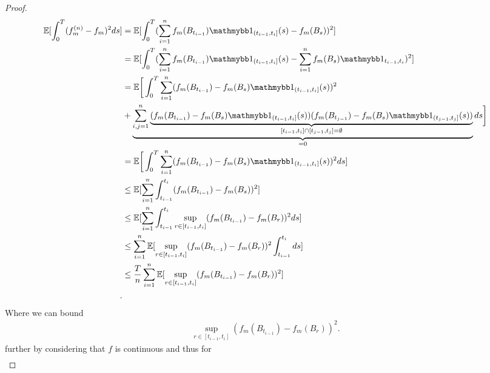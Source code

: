 \begin{proof}
\begin{align*}
  \E[\int_0^{T}  (f_m^{(n)} - f_m )^2 ds] &= \E[\int_0^{T} (\sum_{i=1}^{n} f_m(B_{t_{i-1}})\cha_{(t_{i-1},t_i]}(s) - f_m(B_s))^2 ] \\
                                          &= \E[\int_0^{T} (\sum_{i=1}^{n} f_m(B_{t_{i-1}})\cha_{(t_{i-1},t_i]}(s) - \sum_{i=1}^{n} f_m(B_s) \cha_{t_{{i-1}},t_i})^2 ] \\
                                          &= \E\bigg[\int_0^{T} \sum_{i=1}^{n} (f_m(B_{t_{i-1}})-f_{m}(B_s)\cha_{(t_{i-1},t_i]}(s))^2 \\
                                          &+ \underbrace{\sum_{i,j=1}^{n} \underbrace{(f_m(B_{t_{i-1}})-f_{m}(B_s)\cha_{(t_{i-1},t_i]}(s))(f_m(B_{t_{j-1}})-f_{m}(B_s)\cha_{(t_{j-1},t_j]}(s))}_{{[t_{i-1}},t_i] \cap [t_{j-1},t_{j}] = \emptyset }}_{=0}  ds \bigg] \\
                                          &= \E\bigg[\int_0^{T} \sum_{i=1}^{n} (f_m(B_{t_{i-1}})-f_{m}(B_s)\cha_{(t_{i-1},t_i]}(s))^2 ds] \\
                                          &\le   \E[\sum_{i=1}^{n} \int_{t_{i-1}}^{t_i} (f_m(B_{t_{i-1}}) - f_m(B_s))^2 ] \\
                                          &\le   \E[\sum_{i=1}^{n} \int_{t_{i-1}}^{t_i} \sup_{r \in [t_{i-1},t_{i}]}(f_m(B_{t_{i-1}})-f_m(B_r))^2 ds] \\
                                          &\le   \sum_{i=1}^{n} \E[\sup_{r \in [t_{i-1},t_{i}]}(f_m(B_{t_{i-1}})-f_m(B_r))^2 \int_{t_{i-1}}^{t_i}  ds] \\
                                          &\le    \frac{T}{n} \sum_{i=1}^{n} \E[\sup_{r \in [t_{i-1},t_{i}]}(f_m(B_{t_{i-1}})-f_m(B_r))^2 ] \\
.\end{align*}
Where we can bound 
\begin{align*}
  \sup_{r \in [t_{i-1},t_{i}]}(f_m(B_{t_{i-1}})-f_m(B_r))^2 
.\end{align*}
further by considering that $f$ is continuous and thus for 
\begin{align*}  

\end{align*}
\end{proof}
